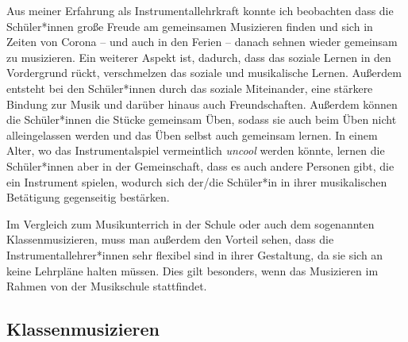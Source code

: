 Aus meiner Erfahrung als Instrumentallehrkraft konnte ich beobachten dass die
Schüler*innen große Freude am gemeinsamen Musizieren finden und sich in Zeiten
von Corona – und auch in den Ferien – danach sehnen wieder gemeinsam zu musizieren.
Ein weiterer Aspekt ist, dadurch, dass das soziale Lernen in den Vordergrund
rückt, verschmelzen das soziale und musikalische Lernen. Außerdem entsteht bei
den Schüler*innen durch das soziale Miteinander, eine stärkere Bindung zur Musik
und darüber hinaus auch Freundschaften.
Außerdem können die Schüler*innen die Stücke gemeinsam Üben, sodass sie auch
beim Üben nicht alleingelassen werden und das Üben selbst auch gemeinsam lernen.
In einem Alter, wo das Instrumentalspiel vermeintlich \emph{uncool} werden
könnte, lernen die Schüler*innen aber in der Gemeinschaft, dass es auch andere
Personen gibt, die ein Instrument spielen, wodurch sich der/die Schüler*in in
ihrer musikalischen Betätigung gegenseitig bestärken.
\autocite{ernst:die_zukunftsfaehige_musikschule}

Im Vergleich zum Musikunterrich in der Schule oder auch dem sogenannten
Klassenmusizieren, muss man außerdem den Vorteil sehen, dass die
Instrumentallehrer*innen sehr flexibel sind in ihrer Gestaltung, da sie sich an
keine Lehrpläne halten müssen. Dies gilt besonders, wenn das Musizieren im
Rahmen von der Musikschule stattfindet.



\subsection{Klassenmusizieren}

